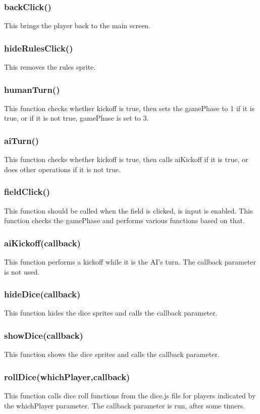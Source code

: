 \documentclass[12pt]{article}
\begin{document}
\subsubsection*{backClick()}
This brings the player back to the main screen. 
\subsubsection*{hideRulesClick()}
This removes the rules sprite. 
\subsubsection*{humanTurn()}
This function checks whether kickoff is true, then sets the gamePhase
to 1 if it is true, or  if it is not true, gamePhase is set to 3. 
\subsubsection*{aiTurn()}
This function checks whether kickoff is true, then calls aiKickoff if
it is true, or does other operations if it is not true. 
\subsubsection*{fieldClick()}
This function should be called when the field is clicked, is input
is enabled. This function checks the gamePhase and performs various
functions based on that. 
\subsubsection*{aiKickoff(callback)}
This function performs a kickoff while it is the AI's turn. 
The callback parameter is not used. 
\subsubsection*{hideDice(callback)}
This function hides the dice sprites and calls the callback
parameter. 
\subsubsection*{showDice(callback)}
This function shows the dice sprites and calls the callback 
parameter.
\subsubsection*{rollDice(whichPlayer,callback)}
This function calls dice roll functions from the dice.js file 
for players indicated by the whichPlayer parameter. The callback
parameter is run, after some timers. 
\end{document}
